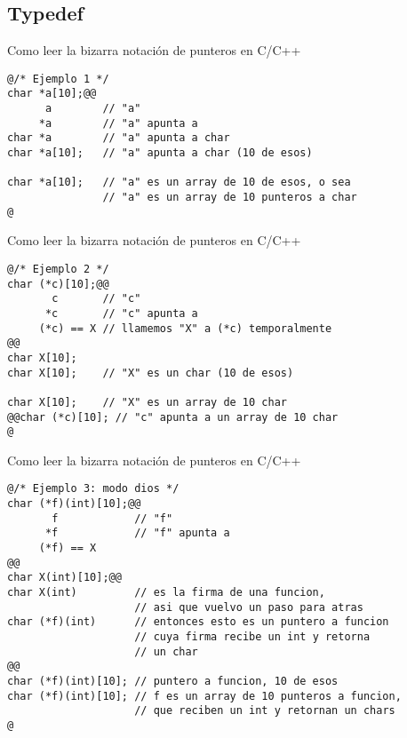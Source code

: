\subsection{Typedef}
\begin{frame}[fragile]{Como leer la bizarra notaci\'on de punteros en C/C++}
         \begin{lstlisting}[style=dimmided]
@/* Ejemplo 1 */
char *a[10];@@
      a        // "a" 
     *a        // "a" apunta a
char *a        // "a" apunta a char
char *a[10];   // "a" apunta a char (10 de esos)

char *a[10];   // "a" es un array de 10 de esos, o sea
               // "a" es un array de 10 punteros a char
@
         \end{lstlisting}
\end{frame}
\begin{frame}[fragile]{Como leer la bizarra notaci\'on de punteros en C/C++}
         \begin{lstlisting}[style=dimmided]
@/* Ejemplo 2 */
char (*c)[10];@@
       c       // "c"
      *c       // "c" apunta a
     (*c) == X // llamemos "X" a (*c) temporalmente
@@
char X[10];
char X[10];    // "X" es un char (10 de esos)

char X[10];    // "X" es un array de 10 char
@@char (*c)[10]; // "c" apunta a un array de 10 char
@
         \end{lstlisting}
\end{frame}
\begin{frame}[fragile]{Como leer la bizarra notaci\'on de punteros en C/C++}
         \begin{lstlisting}[style=dimmided]
@/* Ejemplo 3: modo dios */
char (*f)(int)[10];@@
       f            // "f"
      *f            // "f" apunta a
     (*f) == X      
@@
char X(int)[10];@@
char X(int)         // es la firma de una funcion,
                    // asi que vuelvo un paso para atras
char (*f)(int)      // entonces esto es un puntero a funcion
                    // cuya firma recibe un int y retorna 
                    // un char
@@
char (*f)(int)[10]; // puntero a funcion, 10 de esos
char (*f)(int)[10]; // f es un array de 10 punteros a funcion,
                    // que reciben un int y retornan un chars
@
         \end{lstlisting}
\end{frame}

